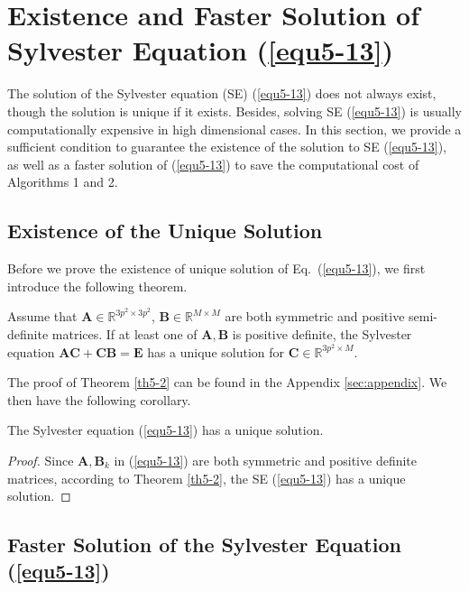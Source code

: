 \section{Existence and Faster Solution of Sylvester Equation (\ref{equ5-13})}


The solution of the Sylvester equation (SE) (\ref{equ5-13}) does not always exist, though the solution is unique if it exists. Besides, solving SE (\ref{equ5-13}) is usually computationally expensive in high dimensional cases. In this section, we provide a sufficient condition to guarantee the existence of the solution to SE (\ref{equ5-13}), as well as a faster solution of (\ref{equ5-13}) to save the computational cost of Algorithms 1 and 2. 


\subsection{Existence of the Unique Solution}

Before we prove the existence of unique solution of Eq.\ (\ref{equ5-13}), we first introduce the following theorem. 

\begin{theorem}
\label{th5-2}
Assume that $\bm{A}\in\mathbb{R}^{3p^2\times 3p^2}$, $\bm{B}\in\mathbb{R}^{M\times M}$ are both symmetric and positive semi-definite matrices. If at least one of $\bm{A}, \bm{B}$ is positive definite, the Sylvester equation $\bm{A}\bm{C}
+
\bm{C}\bm{B}
=
\bm{E}$ has a unique solution for $\bm{C}\in \mathbb{R}^{3p^2\times M}$.
\end{theorem}

The proof of Theorem \ref{th5-2} can be found in the Appendix \ref{sec:appendix}. We then have the following corollary.

\begin{corollary}
The Sylvester equation (\ref{equ5-13}) has a unique solution.
\end{corollary}

\begin{proof}
Since $\bm{A},\bm{B}_{k}$ in (\ref{equ5-13}) are both symmetric and positive definite matrices, according to Theorem \ref{th5-2}, the SE (\ref{equ5-13}) has a unique solution. 
\end{proof}


\subsection{Faster Solution of the Sylvester Equation (\ref{equ5-13})}

